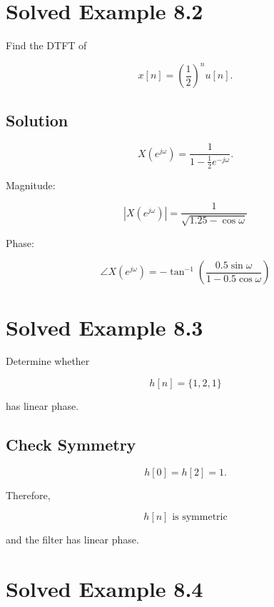 
\section{Solved Example 8.2}

Find the DTFT of

\[
x[n]=\left(\frac12\right)^n u[n].
\]


\subsection{Solution}

\[
X(e^{j\omega})=
\frac{1}{1-\frac12 e^{-j\omega}}.
\]

Magnitude:

\[
\boxed{
|X(e^{j\omega})|=
\frac{1}{\sqrt{1.25-\cos\omega}}
}
\]

Phase:

\[
\boxed{
\angle X(e^{j\omega})=
-\tan^{-1}
\left(
\frac{0.5\sin\omega}{1-0.5\cos\omega}
\right)
}
\]


\section{Solved Example 8.3}

Determine whether

\[
h[n]=\{1,2,1\}
\]

has linear phase.


\subsection{Check Symmetry}

\[
h[0]=h[2]=1.
\]

Therefore,

\[
\boxed{
h[n]\text{ is symmetric}
}
\]

and the filter has linear phase.


\section{Solved Example 8.4}

